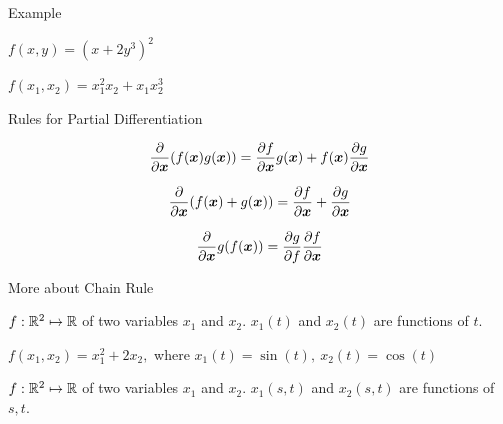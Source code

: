 \documentclass[handout,fleqn,aspectratio=169]{beamer}
\begin{document}
\begin{frame}{Example}

\plitemsep 0.1in

\bci 
\item \exam $f(x,y) = (x+2y^3)^2$

\item \exam $f(x_1, x_2) = x_1^2 x_2 + x_1 x_2^3$
\eci
\end{frame}

\begin{frame}{Rules for Partial Differentiation}

\plitemsep 0.2in

\bci 
\item {} $$\frac{\partial }{\partial \bm{x}}(f(\bm{x})g(\bm{x})) = \frac{\partial f}{\partial \bm{x}} g(\bm{x}) + f(\bm{x})\frac{\partial g}{\partial \bm{x}}$$

\item {} $$\frac{\partial }{\partial \bm{x}} (f(\bm{x})+ g(\bm{x})) = \frac{\partial f}{\partial \bm{x}} + \frac{\partial g}{\partial \bm{x}}$$

\item {} $$\frac{\partial }{\partial \bm{x}} g(f(\bm{x})) = \frac{\partial g}{\partial f}\frac{\partial f}{\partial \bm{x}}$$

\eci
\end{frame}

\begin{frame}{More about Chain Rule}

\plitemsep 0.05in

\bci 
\item $f: {\mathbb R}^2 \mapsto {\mathbb R}$ of two variables $x_1$ and $x_2.$ $x_1(t)$ and $x_2(t)$ are functions of $t.$
\item \exam $f(x_1, x_2) = x_1^2 + 2 x_2,$ where $x_1(t) = \sin(t),\ x_2(t)=\cos(t)$

\item $f: {\mathbb R}^2 \mapsto {\mathbb R}$ of two variables $x_1$ and $x_2.$ $x_1(s,t)$ and $x_2(s,t)$ are functions of $s,t.$

{
\small
\vspace{-0.2cm}
}
{
}
\eci
\end{frame}
\end{document}
